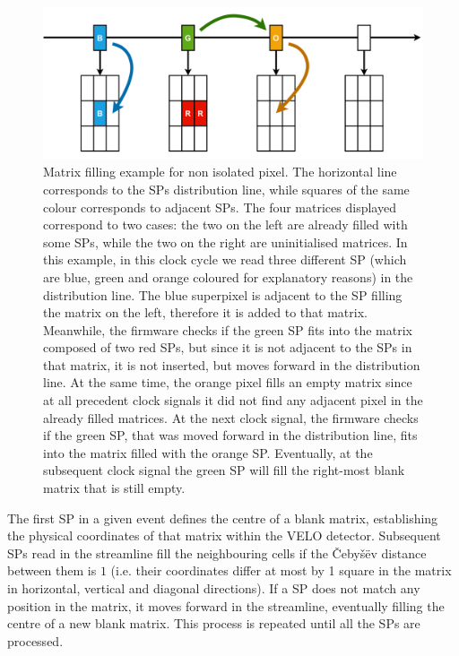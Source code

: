 \begin{figure}
    \centering
    \includegraphics[width=\textwidth]{figures/matrix_filling_clustering.png}
    \caption{Matrix filling example for non isolated pixel. The horizontal line corresponds to the SPs distribution line, while squares of the same colour corresponds to adjacent SPs. The four matrices displayed correspond to two cases: the two on the left are already filled with some SPs, while the two on the right are uninitialised matrices. In this example, in this clock cycle we read three different SP (which are blue, green and orange coloured for explanatory reasons) in the distribution line. The blue superpixel is adjacent to the SP filling the matrix on the left, therefore it is added to that matrix. Meanwhile, the firmware checks if the green SP fits into the matrix composed of two red SPs, but since it is not adjacent to the SPs in that matrix, it is not inserted, but moves forward in the distribution line. At the same time, the orange pixel fills an empty matrix since at all precedent clock signals it did not find any adjacent pixel in the already filled matrices. At the next clock signal, the firmware checks if the green SP, that was moved forward in the distribution line, fits into the matrix filled with the orange SP. Eventually, at the subsequent clock signal the green SP will fill the right-most blank matrix that is still empty.}
    \label{fig:matrix_filling_clustering}
\end{figure}


The first SP in a given event defines the centre of a blank matrix, establishing the physical coordinates of that matrix within the VELO detector. Subsequent SPs read in the streamline fill the neighbouring cells if the Čebyšëv distance between them is $1$ (i.e. their coordinates differ at most by 1 square in the matrix in horizontal, vertical and diagonal directions). If a SP does not match any position in the matrix, it moves forward in the streamline, eventually filling the centre of a new blank matrix. This process is repeated until all the SPs are processed.

